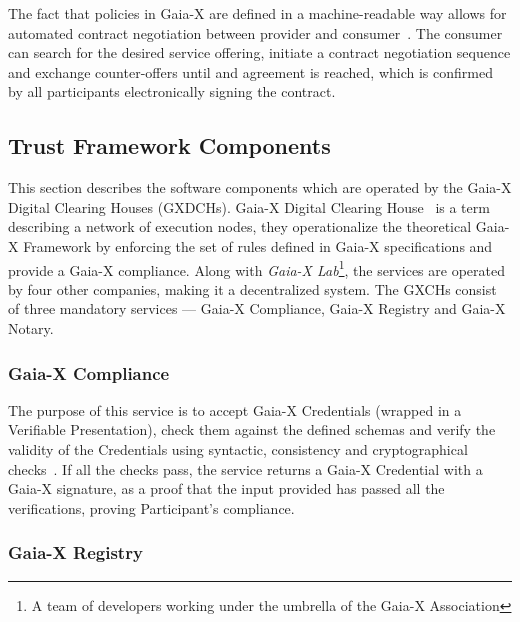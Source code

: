 The fact that policies in Gaia-X are defined in a machine-readable way allows for automated contract negotiation between provider and consumer~\cite{gaiax_data_exchange_document}.
The consumer can search for the desired service offering, initiate a contract negotiation sequence and exchange counter-offers until and agreement is reached, which is confirmed by all participants electronically signing the contract.

\subsection{Trust Framework Components}\label{subsec:trust-framework-components}

This section describes the software components which are operated by the Gaia-X Digital Clearing Houses (GXDCHs).
Gaia-X Digital Clearing House~\cite{gaiax} is a term describing a network of execution nodes, they operationalize the theoretical Gaia-X Framework by enforcing the set of rules defined in Gaia-X specifications and provide a Gaia-X compliance.
Along with \textit{Gaia-X Lab}\footnote{A team of developers working under the umbrella of the Gaia-X Association}, the services are operated by four other companies, making it a decentralized system.
The GXCHs consist of three mandatory services --- Gaia-X Compliance, Gaia-X Registry and Gaia-X Notary.

\subsubsection{Gaia-X Compliance}

The purpose of this service is to accept Gaia-X Credentials (wrapped in a Verifiable Presentation), check them against the defined schemas and verify the validity of the Credentials using syntactic, consistency and cryptographical checks~\cite{gaiax_trust_framework}.
If all the checks pass, the service returns a Gaia-X Credential with a Gaia-X signature, as a proof that the input provided has passed all the verifications, proving Participant's compliance.

\subsubsection{Gaia-X Registry}

